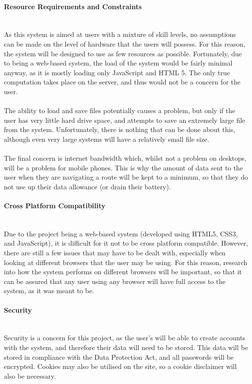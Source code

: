 \paragraph{Resource Requirements and Constraints}\ \\
As this system is aimed at users with a mixture of skill levels, no assumptions can be made on the level of hardware that the users will possess. For this reason, the system will be designed to use as few resources as possible. Fortunately, due to being a web-based system, the load of the system would be fairly minimal anyway, as it is mostly loading only JavaScript and HTML 5. The only true computation takes place on the server, and thus would not be a concern for the user.\ \\
\ \\
The ability to load and save files potentially causes a problem, but only if the user has very little hard drive space, and attempts to save an extremely large file from the system. Unfortunately, there is nothing that can be done about this, although even very large systems will have a relatively small file size.\ \\
\ \\
The final concern is internet bandwidth which, whilst not a problem on desktops, will be a problem for mobile phones. This is why the amount of data sent to the user when they are navigating a route will be kept to a minimum, so that they do not use up their data allowance (or drain their battery).

\paragraph{Cross Platform Compatibility}\ \\
Due to the project being a web-based system (developed using HTML5, CSS3, and JavaScript), it is difficult for it not to be cross platform compatible. However, there are still a few issues that may have to be dealt with, especially when looking at different browsers that the user may be using. For this reason, research into how the system performs on different browsers will be important, so that it can be assured that any user using any browser will have full access to the system, as it was meant to be.

\paragraph{Security}\ \\
Security is a concern for this project, as the user's will be able to create accounts with the system, and therefore their data will need to be stored. This data will be stored in compliance with the Data Protection Act, and all passwords will be encrypted. Cookies may also be utilised on the site, so a cookie disclaimer will also be necessary. 

